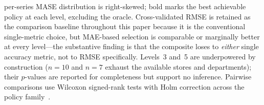\begin{table}[!t]
\begin{minipage}{\textwidth}
per-series MASE distribution is right-skewed; bold marks the best achievable policy at each level, excluding the oracle.
Cross-validated RMSE is retained as the comparison baseline throughout this paper because it is the conventional
single-metric choice, but MAE-based selection is comparable or marginally better at every level---the substantive finding
is that the composite loses to \emph{either} single accuracy metric, not to RMSE specifically. Levels~3 and~5 are
underpowered by construction ($n=10$ and $n=7$ exhaust the available stores and departments); their $p$-values are
reported for completeness but support no inference. Pairwise comparisons use Wilcoxon signed-rank tests with Holm
correction across the policy family~\cite{demsar2006statistical}.
\end{minipage}
\end{table}
